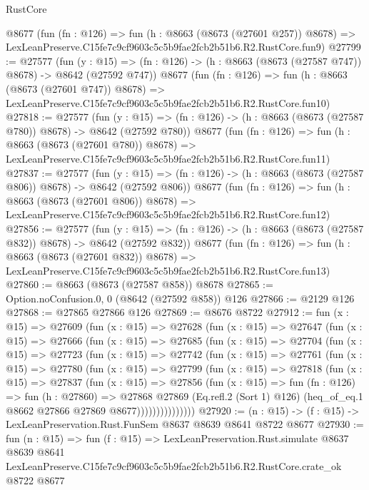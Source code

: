\begin{lexlean}{RustCore}
\begin{coremodule}
    @8677
    (fun (fn : @126) =>
    fun (h : @8663 (@8673 (@27601 @257)) @8678) =>
    LexLeanPreserve.C15fe7c9cf9603c5c5b9fae2fcb2b51b6.R2.RustCore.fun9)
@27799 := @27577
    (fun (y : @15) => (fn : @126) -> (h : @8663 (@8673 (@27587 @747)) @8678) -> @8642 (@27592 @747))
    @8677
    (fun (fn : @126) =>
    fun (h : @8663 (@8673 (@27601 @747)) @8678) =>
    LexLeanPreserve.C15fe7c9cf9603c5c5b9fae2fcb2b51b6.R2.RustCore.fun10)
@27818 := @27577
    (fun (y : @15) => (fn : @126) -> (h : @8663 (@8673 (@27587 @780)) @8678) -> @8642 (@27592 @780))
    @8677
    (fun (fn : @126) =>
    fun (h : @8663 (@8673 (@27601 @780)) @8678) =>
    LexLeanPreserve.C15fe7c9cf9603c5c5b9fae2fcb2b51b6.R2.RustCore.fun11)
@27837 := @27577
    (fun (y : @15) => (fn : @126) -> (h : @8663 (@8673 (@27587 @806)) @8678) -> @8642 (@27592 @806))
    @8677
    (fun (fn : @126) =>
    fun (h : @8663 (@8673 (@27601 @806)) @8678) =>
    LexLeanPreserve.C15fe7c9cf9603c5c5b9fae2fcb2b51b6.R2.RustCore.fun12)
@27856 := @27577
    (fun (y : @15) => (fn : @126) -> (h : @8663 (@8673 (@27587 @832)) @8678) -> @8642 (@27592 @832))
    @8677
    (fun (fn : @126) =>
    fun (h : @8663 (@8673 (@27601 @832)) @8678) =>
    LexLeanPreserve.C15fe7c9cf9603c5c5b9fae2fcb2b51b6.R2.RustCore.fun13)
@27860 := @8663 (@8673 (@27587 @858)) @8678
@27865 := Option.noConfusion.{0, 0} (@8642 (@27592 @858)) @126
@27866 := @2129 @126
@27868 := @27865 @27866 @126
@27869 := @8676 @8722
@27912 := fun (x : @15) =>
  @27609
    (fun (x : @15) =>
    @27628
      (fun (x : @15) =>
      @27647
        (fun (x : @15) =>
        @27666
          (fun (x : @15) =>
          @27685
            (fun (x : @15) =>
            @27704
              (fun (x : @15) =>
              @27723
                (fun (x : @15) =>
                @27742
                  (fun (x : @15) =>
                  @27761
                    (fun (x : @15) =>
                    @27780
                      (fun (x : @15) =>
                      @27799
                        (fun (x : @15) =>
                        @27818
                          (fun (x : @15) =>
                          @27837
                            (fun (x : @15) =>
                            @27856
                              (fun (x : @15) =>
                              fun (fn : @126) =>
                              fun (h : @27860) =>
                              @27868
                                @27869
                                (Eq.refl.{2} (Sort 1) @126)
                                (heq_of_eq.{1} @8662 @27866 @27869 @8677)))))))))))))))
@27920 := (n : @15) -> (f : @15) -> LexLeanPreservation.Rust.FunSem @8637 @8639 @8641 @8722 @8677
@27930 := fun (n : @15) =>
  fun (f : @15) =>
  LexLeanPreservation.Rust.simulate
    @8637
    @8639
    @8641
    LexLeanPreserve.C15fe7c9cf9603c5c5b9fae2fcb2b51b6.R2.RustCore.crate_ok
    @8722
    @8677
\end{coremodule}
\end{lexlean}
